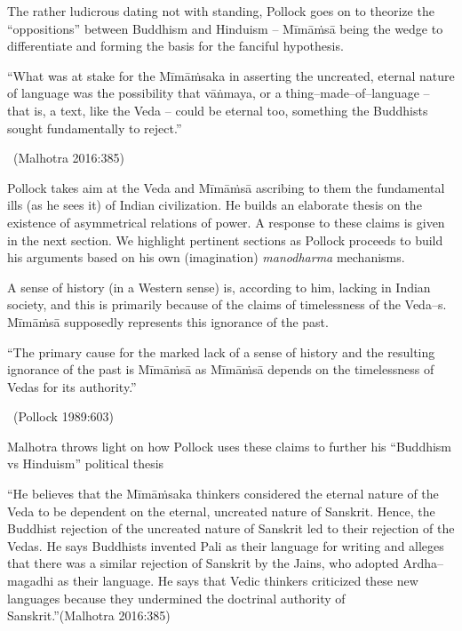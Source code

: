 The rather ludicrous dating not with standing, Pollock goes on to theorize the “oppositions” between Buddhism and Hinduism – Mīmāṁsā being the wedge to differentiate and forming the basis for the fanciful hypothesis.

\begin{myquote}
“What was at stake for the Mīmāṁsaka in asserting the uncreated, eternal nature of language was the possibility that vāṅmaya, or a thing–made–of–language – that is, a text, like the Veda – could be eternal too, something the Buddhists sought fundamentally to reject.”

~\hfill (Malhotra 2016:385)
\end{myquote}

Pollock takes aim at the Veda and Mīmāṁsā ascribing to them the fundamental ills (as he sees it) of Indian civilization. He builds an elaborate thesis on the existence of asymmetrical relations of power. A response to these claims is given in the next section. We highlight pertinent sections as Pollock proceeds to build his arguments based on his own (imagination) \textit{manodharma} mechanisms.

A sense of history (in a Western sense) is, according to him, lacking in Indian society, and this is primarily because of the claims of timelessness of the Veda–s. Mīmāṁsā supposedly represents this ignorance of the past.

\begin{myquote}
“The primary cause for the marked lack of a sense of history and the resulting ignorance of the past is Mīmāṁsā as Mīmāṁsā depends on the timelessness of Vedas for its authority.”

~\hfill (Pollock 1989:603)
\end{myquote}

Malhotra throws light on how Pollock uses these claims to further his “Buddhism vs Hinduism” political thesis

\begin{myquote}
“He believes that the Mīmāṁsaka thinkers considered the eternal nature of the Veda to be dependent on the eternal, uncreated nature of Sanskrit. Hence, the Buddhist rejection of the uncreated nature of Sanskrit led to their rejection of the Vedas. He says Buddhists invented Pali as their language for writing and alleges that there was a similar rejection of Sanskrit by the Jains, who adopted Ardha–magadhi as their language. He says that Vedic thinkers criticized these new languages because they undermined the doctrinal authority of Sanskrit.”\hfill (Malhotra 2016:385)
\end{myquote}

